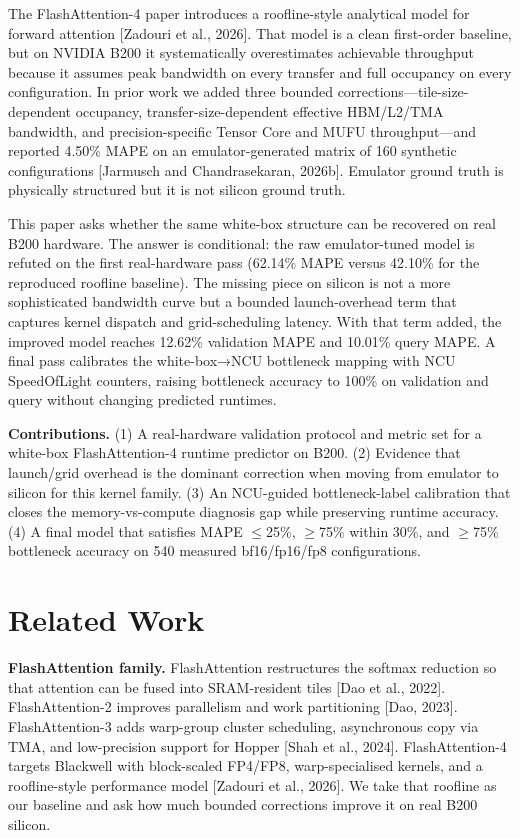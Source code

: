 \documentclass[
  11pt,
]{article}
\begin{document}
The FlashAttention-4 paper introduces a roofline-style analytical model
for forward attention {[}Zadouri et al., 2026{]}. That model is a clean
first-order baseline, but on NVIDIA B200 it systematically overestimates
achievable throughput because it assumes peak bandwidth on every
transfer and full occupancy on every configuration. In prior work we
added three bounded corrections---tile-size-dependent occupancy,
transfer-size-dependent effective HBM/L2/TMA bandwidth, and
precision-specific Tensor Core and MUFU throughput---and reported 4.50\%
MAPE on an emulator-generated matrix of 160 synthetic configurations
{[}Jarmusch and Chandrasekaran, 2026b{]}. Emulator ground truth is
physically structured but it is not silicon ground truth.

This paper asks whether the same white-box structure can be recovered on
real B200 hardware. The answer is conditional: the raw emulator-tuned
model is refuted on the first real-hardware pass (62.14\% MAPE versus
42.10\% for the reproduced roofline baseline). The missing piece on
silicon is not a more sophisticated bandwidth curve but a bounded
launch-overhead term that captures kernel dispatch and grid-scheduling
latency. With that term added, the improved model reaches 12.62\%
validation MAPE and 10.01\% query MAPE. A final pass calibrates the
white-box→NCU bottleneck mapping with NCU SpeedOfLight counters, raising
bottleneck accuracy to 100\% on validation and query without changing
predicted runtimes.

\textbf{Contributions.} (1) A real-hardware validation protocol and
metric set for a white-box FlashAttention-4 runtime predictor on B200.
(2) Evidence that launch/grid overhead is the dominant correction when
moving from emulator to silicon for this kernel family. (3) An
NCU-guided bottleneck-label calibration that closes the
memory-vs-compute diagnosis gap while preserving runtime accuracy. (4) A
final model that satisfies MAPE $\le$25\%, $\ge$75\% within
30\%, and $\ge$75\% bottleneck accuracy on 540 measured
bf16/fp16/fp8 configurations.

\section{Related Work}\label{related-work}

\textbf{FlashAttention family.} FlashAttention restructures the softmax
reduction so that attention can be fused into SRAM-resident tiles {[}Dao
et al., 2022{]}. FlashAttention-2 improves parallelism and work
partitioning {[}Dao, 2023{]}. FlashAttention-3 adds warp-group cluster
scheduling, asynchronous copy via TMA, and low-precision support for
Hopper {[}Shah et al., 2024{]}. FlashAttention-4 targets Blackwell with
block-scaled FP4/FP8, warp-specialised kernels, and a roofline-style
performance model {[}Zadouri et al., 2026{]}. We take that roofline as
our baseline and ask how much bounded corrections improve it on real
B200 silicon.
\end{document}

